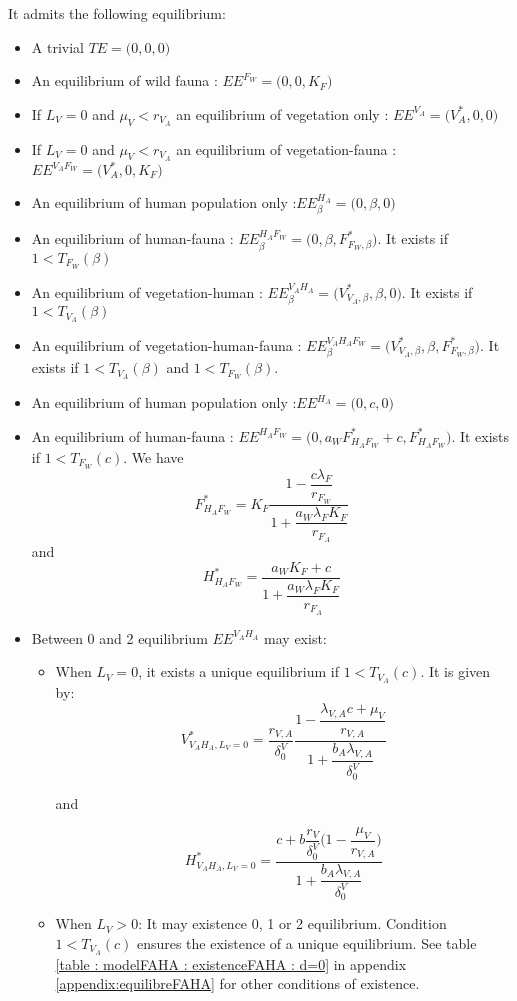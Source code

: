 \documentclass{article}
\newcommand{\lva}{\lambda_{V, A}}
\newcommand{\lfw}{\lambda_{F}}
\newcommand{\dv}{\delta_0^V}
\begin{document}
It admits the following equilibrium:
\begin{itemize}
\item A trivial $TE = \Big(0,0,0\Big)$
\item An equilibrium of wild fauna : $EE^{F_W} = \Big(0,0,K_F\Big)$
\item If $L_V = 0$ and $\mu_V < r_{V_A}$ an equilibrium of vegetation only : $EE^{V_A} = \Big(V_A^*, 0, 0 \Big)$
\item If $L_V = 0$ and $\mu_V < r_{V_A}$ an equilibrium of vegetation-fauna : $EE^{V_AF_W} = \Big(V_A^*, 0, K_F \Big)$

\item An equilibrium of human population only :$EE^{H_A}_\beta = \Big(0, \beta, 0\Big)$
\item An equilibrium of human-fauna : $EE^{H_AF_W}_\beta = \Big(0, \beta, F^*_{F_W, \beta} \Big)$. It exists if $1 < T_{F_W}(\beta)$
\item An equilibrium of vegetation-human : $EE^{V_AH_A}_\beta = \Big(V^*_{V_A, \beta}, \beta, 0 \Big)$. It exists if $1 < T_{V_A}(\beta)$
\item An equilibrium of vegetation-human-fauna : $EE^{V_AH_AF_W}_\beta = \Big(V^*_{V_A, \beta}, \beta, F^*_{F_W, \beta} \Big)$. It exists if $1 < T_{V_A}(\beta)$ and $1 < T_{F_W}(\beta)$.

\item An equilibrium of human population only :$EE^{H_A} = \Big(0, c, 0\Big)$
\item An equilibrium of human-fauna : $EE^{H_AF_W} = \Big(0, a_W F_{H_AF_W}^* + c, F^*_{H_AF_W} \Big)$. It exists if $1 < T_{F_W}(c)$. We have $$F^*_{H_AF_W} = K_F \dfrac{1 - \dfrac{c \lfw}{r_{F_W}}}{1 + \dfrac{a_W \lfw K_F}{r_{F_A}}}$$ and 
$$
H^*_{H_AF_W} = \dfrac{a_W K_F + c}{1 + \dfrac{a_W \lfw K_F}{r_{F_A}}}
$$

\item Between 0 and 2 equilibrium $EE^{V_AH_A}$ may exist:
\begin{itemize}
\item When $L_V = 0$, it exists a unique equilibrium if $1 < T_{V_A}(c)$. It is given by:
$$
V_{V_AH_A,L_V=0}^* = \dfrac{r_{V,A}}{\dv} \dfrac{1 - \dfrac{\lva c + \mu_V}{r_{V,A}}}{1 + \dfrac{b_A \lva}{\dv}}
$$

and

$$
H_{V_AH_A,L_V=0}^* = \dfrac{c + b \dfrac{r_V}{\dv} \Big(1 - \dfrac{\mu_V}{r_{V,A}}\Big) }{1 + \dfrac{b_A \lva}{\dv}}
$$

\item When $L_V > 0$: It may existence 0, 1 or 2 equilibrium. Condition $1 < T_{V_A}(c)$ ensures the existence of a unique equilibrium. See table \ref{table : modelFAHA : existenceFAHA : d=0} in appendix \ref{appendix:equilibreFAHA} for other conditions of existence.


\end{itemize}
\end{itemize}
\end{document}
